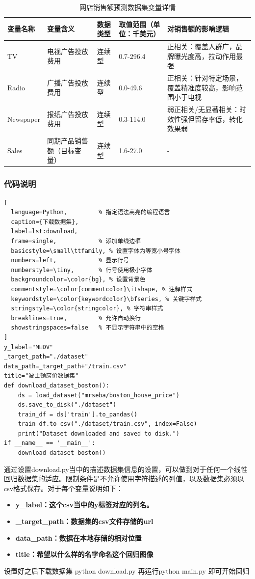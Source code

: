 \begin{table}[!hpt]
  \caption{网店销售额预测数据集变量详情}
  \label{tab:advertising_variables}
  \centering
  \small
  \begin{tabular}{@{}p{}p{}p{}p{}p{}@{}} \toprule
    \textbf{变量名称} & \textbf{变量含义} & \textbf{数据类型} & \textbf{取值范围（单位：千美元）} & \textbf{对销售额的影响逻辑} \\ \midrule
    TV & 电视广告投放费用 & 连续型 & 0.7-296.4 & 正相关：覆盖人群广，品牌曝光度高，拉动作用最强 \\
    Radio & 广播广告投放费用 & 连续型 & 0.0-49.6 & 正相关：针对特定场景，覆盖精准度较高，影响范围小于电视 \\
    Newspaper & 报纸广告投放费用 & 连续型 & 0.3-114.0 & 弱正相关/无显著相关：时效性强但留存率低，转化效果弱 \\
    Sales & 同期产品销售额（目标变量） & 连续型 & 1.6-27.0 & - \\ \bottomrule
  \end{tabular}
\end{table}
\subsubsection{代码说明}
\begin{lstlisting}[
  language=Python,         % 指定语法高亮的编程语言
  caption={下载数据集},
  label=lst:download,
  frame=single,            % 添加单线边框
  basicstyle=\small\ttfamily, % 设置字体为等宽小号字体
  numbers=left,            % 显示行号
  numberstyle=\tiny,       % 行号使用极小字体
  backgroundcolor=\color{bg}, % 设置背景色
  commentstyle=\color{commentcolor}\itshape, % 注释样式
  keywordstyle=\color{keywordcolor}\bfseries, % 关键字样式
  stringstyle=\color{stringcolor}, % 字符串样式
  breaklines=true,         % 允许自动换行
  showstringspaces=false   % 不显示字符串中的空格
]
y_label="MEDV"
_target_path="./dataset"
data_path=_target_path+"/train.csv"
title="波士顿房价数据集"
def download_dataset_boston():
	ds = load_dataset("mrseba/boston_house_price")
	ds.save_to_disk("./dataset")
	train_df = ds['train'].to_pandas()
	train_df.to_csv("./dataset/train.csv", index=False)
	print("Dataset downloaded and saved to disk.")
if __name__ == '__main__':
	download_dataset_boston()
\end{lstlisting}


\par 通过设置download.py当中的描述数据集信息的设置，可以做到对于任何一个线性回归数据集的适应。限制条件是不允许使用字符描述的列值，以及数据集必须以csv格式保存。对于每个变量说明如下：
\begin{itemize}
\item \bf{y\_label}：这个csv当中的y标签对应的列名。
\item \bf{\_target\_path}：数据集的csv文件存储的url
\item \bf{data\_path}：数据在本地存储的相对位置
\item \bf{title}：希望以什么样的名字命名这个回归图像
\end{itemize}

\par 设置好之后下载数据集 python download.py 再运行python main.py 即可开始回归



